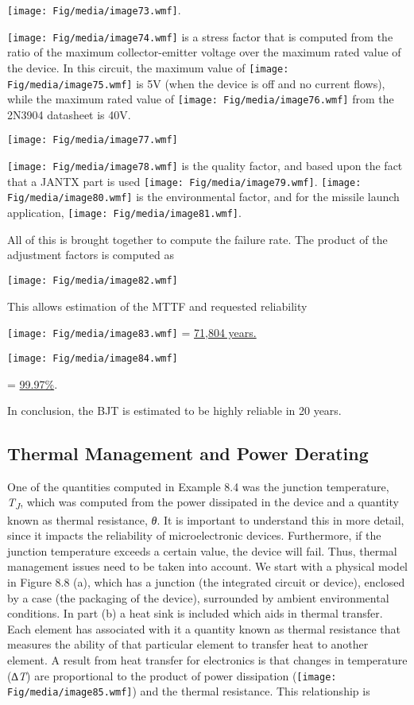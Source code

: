 \texttt{[image: Fig/media/image73.wmf]}.

\texttt{[image: Fig/media/image74.wmf]} is a stress factor that is
computed from the ratio of the maximum collector-emitter voltage over
the maximum rated value of the device. In this circuit, the maximum
value of \texttt{[image: Fig/media/image75.wmf]} is 5V (when the device
is off and no current flows), while the maximum rated value of
\texttt{[image: Fig/media/image76.wmf]} from the 2N3904 datasheet is
40V.

\texttt{[image: Fig/media/image77.wmf]}

\texttt{[image: Fig/media/image78.wmf]} is the quality factor, and based
upon the fact that a JANTX part is used
\texttt{[image: Fig/media/image79.wmf]}.
\texttt{[image: Fig/media/image80.wmf]} is the environmental factor, and
for the missile launch application,
\texttt{[image: Fig/media/image81.wmf]}.

All of this is brought together to compute the failure rate. The product
of the adjustment factors is computed as

\texttt{[image: Fig/media/image82.wmf]}

This allows estimation of the MTTF and requested reliability

\texttt{[image: Fig/media/image83.wmf]} = \ul{71,804 years.}

\texttt{[image: Fig/media/image84.wmf]}

= \ul{99.97\%}.

In conclusion, the BJT is estimated to be highly reliable in 20 years.

\subsection{Thermal Management and Power
Derating}\label{thermal-management-and-power-derating}

One of the quantities computed in Example 8.4 was the junction
temperature, \emph{T\textsubscript{J}}, which was computed from the
power dissipated in the device and a quantity known as thermal
resistance, \emph{θ}. It is important to understand this in more detail,
since it impacts the reliability of microelectronic devices.
Furthermore, if the junction temperature exceeds a certain value, the
device will fail. Thus, thermal management issues need to be taken into
account. We start with a physical model in Figure 8.8 (a), which has a
junction (the integrated circuit or device), enclosed by a case (the
packaging of the device), surrounded by ambient environmental
conditions. In part (b) a heat sink is included which aids in thermal
transfer. Each element has associated with it a quantity known as
thermal resistance that measures the ability of that particular element
to transfer heat to another element. A result from heat transfer for
electronics is that changes in temperature (∆\emph{T}) are proportional
to the product of power dissipation
(\texttt{[image: Fig/media/image85.wmf]}) and the thermal resistance.
This relationship is

